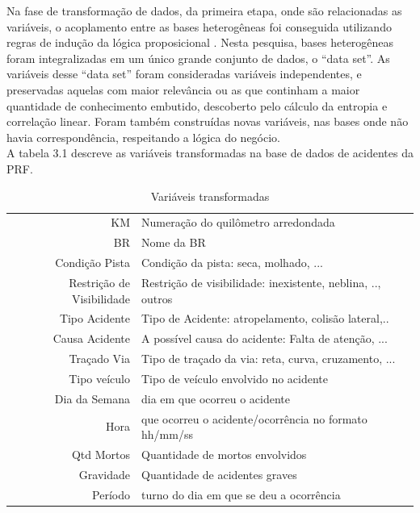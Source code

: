 Na fase de transformação de dados, da primeira etapa, onde são relacionadas as variáveis, o acoplamento  entre as bases heterogêneas foi conseguida utilizando regras de indução da lógica proposicional \cite{NorvigRussel2004}.
Nesta pesquisa, bases heterogêneas foram integralizadas em um único grande conjunto de dados, o ``data set''. As variáveis desse ``data set'' foram consideradas variáveis independentes, e preservadas aquelas com maior relevância ou as que continham a maior quantidade de conhecimento embutido, descoberto pelo cálculo da entropia e correlação linear. Foram também construídas novas variáveis, nas bases onde não havia correspondência, respeitando a lógica do negócio.\\
A tabela 3.1 descreve as variáveis transformadas na base de dados de acidentes da PRF.

\begin{table}[htbp!]
	\centering
	\caption{Variáveis transformadas} 
	\begin{tabular}{r|l} \hline
		KM & Numeração do quilômetro arredondada \\
		BR & Nome da BR \\
		Condição Pista & Condição da pista: seca, molhado, ... \\
		Restrição de Visibilidade & Restrição de visibilidade: inexistente, neblina, .., outros \\
		Tipo Acidente & Tipo de Acidente: atropelamento, colisão lateral,..\\
		Causa Acidente & A possível causa do acidente: Falta de atenção, ... \\
		Traçado Via & Tipo de traçado da via: reta, curva, cruzamento, ... \\
		Tipo veículo & Tipo de veículo envolvido no acidente \\
		Dia da Semana & dia em que ocorreu o acidente\\
		Hora & que ocorreu o acidente/ocorrência no formato hh/mm/ss \\
		Qtd Mortos & Quantidade de mortos envolvidos \\
		Gravidade & Quantidade de acidentes graves \\
		Período & turno do dia em que se deu a ocorrência \\
	\end{tabular}
\end{table}
 
\vspace{7mm}

\pagebreak


